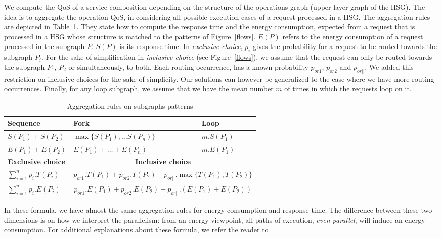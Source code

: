 \documentclass[a4paper]{article}
\begin{document}
We compute the QoS of a service composition depending on the structure of the operations 
graph (upper layer graph of the HSG). The idea is to aggregate the operation QoS, in considering all possible execution cases 
of a request processed in a HSG. The aggregation rules are depicted in Table~\ref{tabAggRules}. 
They state how to compute the response time and the energy consumption,  
expected from a request that is processed in a HSG whose structure 
is matched to the patterns of Figure~\ref{flows}.
$E(P)$ refers to the energy consumption of a request processed in the subgraph $P$. 
$S(P)$ is its response time. In {\it exclusive choice},  $p_i$ gives the probability for a request to be routed towards the subgraph $P_i$.  
For the sake of simplification in {\it inclusive choice} (see Figure~\ref{flows}), we  assume  that the request can only be routed towards the subgraph 
$P_1$, $P_2$ or simultaneously, to both. Each routing occurrence, has  
a known probability $p_{or1}$, $p_{or2}$ and $p_{or||}$. We added this restriction on inclusive choices for the sake of 
simplicity. Our solutions can however be generalized to the case where we have more routing occurrences. 
Finally, for any loop subgraph, we assume that we have 
the mean number $m$ of times in which the requests loop on it. 
\begin{table}[htbp]
\centering
\begin{tabular}{|p{4cm}|p{4cm}|p{2cm}|} 
\hline
\small \textbf{Sequence}   & \small \textbf{Fork}  & \small \textbf{Loop} \\\hline
$S(P_1) + S(P_2)$ & $\max\{ S(P_1),\dots S(P_n) \}$ & $m.S(P_1)$ \\
$E(P_1) + E(P_2)$ & $ E(P_1)+ \dots+ E(P_n)$ & $ m.E(P_1)$ \\\hline
\small \textbf{Exclusive choice} &  \multicolumn{2}{c|}{\small \textbf{Inclusive choice}} \\\hline
 $\sum_{i=1}^n p_i.T(P_i)$  & \multicolumn{2}{c|}{$p_{or1}.T(P_1)+ p_{or2}.T(P_2)$  $ + p_{or||}.\max \{T(P_1), T(P_2)\}$}  \\
 $\sum_{i=1}^n p_i.E(P_i)$  & \multicolumn{2}{c|}{$p_{or1}.E(P_1)+ p_{or2}.E(P_2) +  p_{or||}.(E(P_1)+ E(P_2))$}  \\\hline
\end{tabular}
\caption{Aggregation rules on subgraphs patterns}\label{tabAggRules}
\end{table}
\normalsize

In these formula, we have almost the same aggregation rules for energy consumption and 
response time. The difference between these two dimensions is on how we interpret the parallelism: 
from an energy viewpoint, all paths of execution, {\it even parallel}, will induce an energy consumption. 
For additional explanations about these formula, we refer the reader to~\cite{JISA}. 
\end{document}

